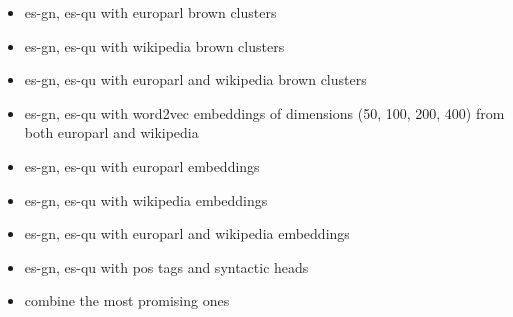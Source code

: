 \begin{itemize}
  \item es-gn, es-qu with europarl brown clusters
  \item es-gn, es-qu with wikipedia brown clusters
  \item es-gn, es-qu with europarl and wikipedia brown clusters
  \item es-gn, es-qu with word2vec embeddings of dimensions (50, 100, 200, 400)
  from both europarl and wikipedia
\end{itemize}

\begin{itemize}
  \item es-gn, es-qu with europarl embeddings
  \item es-gn, es-qu with wikipedia embeddings
  \item es-gn, es-qu with europarl and wikipedia embeddings
  \item es-gn, es-qu with pos tags and syntactic heads
\end{itemize}

\begin{itemize}
  \item combine the most promising ones
\end{itemize}
